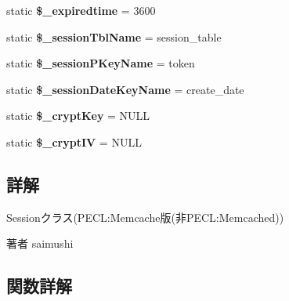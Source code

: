 \begin{DoxyCompactItemize}
\item 
\hypertarget{class_session_memcache_a58a574e235ab48516e50df344ad07d4a}{}static {\bfseries \$\+\_\+expiredtime} = 3600\label{class_session_memcache_a58a574e235ab48516e50df344ad07d4a}

\item 
\hypertarget{class_session_memcache_a5dd5cb5ba2861447803ce4cde3385379}{}static {\bfseries \$\+\_\+session\+Tbl\+Name} = \textquotesingle{}session\+\_\+table\textquotesingle{}\label{class_session_memcache_a5dd5cb5ba2861447803ce4cde3385379}

\item 
\hypertarget{class_session_memcache_a2b9393fcd74a058072fc47a5c3594203}{}static {\bfseries \$\+\_\+session\+P\+Key\+Name} = \textquotesingle{}token\textquotesingle{}\label{class_session_memcache_a2b9393fcd74a058072fc47a5c3594203}

\item 
\hypertarget{class_session_memcache_aabdbeb1bcf3bc5fece544f1eda0ae987}{}static {\bfseries \$\+\_\+session\+Date\+Key\+Name} = \textquotesingle{}create\+\_\+date\textquotesingle{}\label{class_session_memcache_aabdbeb1bcf3bc5fece544f1eda0ae987}

\item 
\hypertarget{class_session_memcache_ae883d74abf717fc163179a54493805b6}{}static {\bfseries \$\+\_\+crypt\+Key} = N\+U\+L\+L\label{class_session_memcache_ae883d74abf717fc163179a54493805b6}

\item 
\hypertarget{class_session_memcache_a10bbda35725655d566951a9c30b4d263}{}static {\bfseries \$\+\_\+crypt\+I\+V} = N\+U\+L\+L\label{class_session_memcache_a10bbda35725655d566951a9c30b4d263}

\end{DoxyCompactItemize}


\subsection{詳解}
Sessionクラス(P\+E\+C\+L\+:Memcache版(非\+P\+E\+C\+L\+:Memcached)) \begin{DoxyAuthor}{著者}
saimushi 
\end{DoxyAuthor}


\subsection{関数詳解}
\hypertarget{class_session_memcache_a33e8d01478a704ea3fe13a2b9518f36e}{}
